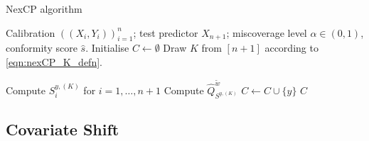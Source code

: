 \documentclass[11pt, titlepage]{article} %
\numberwithin{equation}{section}
\theoremstyle{definition}
\numberwithin{theorem}{section}
\numberwithin{lemma}{section}
\numberwithin{corollary}{section}
\numberwithin{proposition}{section}
\numberwithin{definition}{section}
\numberwithin{remark}{section}
\begin{document}
\begin{algorithm}[H]
    \label{alg:nexCP}
    \caption{NexCP algorithm}
    \begin{algorithmic}
        \Require Calibration \(((X_i, Y_i))_{i=1}^n\); test predictor \(X_{n+1}\); miscoverage level \(\alpha \in (0,1)\), conformity score \(\hat{s}\). 
        \State Initialise \(C \gets \emptyset\)
        \State Draw \(K\) from \([n+1]\) according to \eqref{eqn:nexCP_K_defn}.

            \State Compute \(S_i^{y, (K)}\) for \(i = 1, \ldots, n+1\)
            \State Compute \(\hat{Q}^{\tilde{w}}_{S^{y, (K)}}\)
                \State \(C \gets C \cup \{y\}\)
            \EndIf
        \EndFor
        \Ensure \(C\)
    \end{algorithmic}
\end{algorithm}

\subsection{Covariate Shift}


\vfill \eject

%                                                                             
%                                                                             


\nocite{*}
\printbibliography

\end{document}
